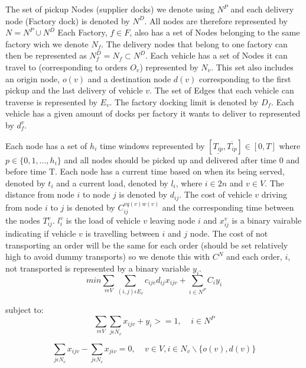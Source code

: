 \documentclass[a4paper,12pt]{article}
\begin{document}
The set of pickup Nodes (supplier docks) we denote using $N^P$ and each delivery node (Factory dock) is denoted by $N^D$. All nodes are therefore represented by $N = N^P \cup N^D$ Each Factory, $f \in F$, also has a set of Nodes belonging to the same factory wich we denote $N_f$. The delivery nodes that belong to one factory can then be represented as $N_f^D = N_f \subset N^D$. 
Each vehicle has a set of Nodes it can travel to (corresponding to orders $O_v$) represented by $N_v$. This set also includes an origin node, $o(v)$ and a destination node $d(v)$ corresponding to the first pickup and the last delivery of vehicle $v$. The set of Edges that each vehicle can traverse is represented by $E_v$. The factory docking limit is denoted by $D_f$. Each vehicle has a given amount of docks per factory it wants to deliver to represented by $d_{f}^v$. \par 
Each node has a set of $h_i$ time windows represented by $[ \underline{T_{ip}},  \overline{T_{ip}} ] \in [0,T]$ where $p \in \{0,1,...,h_i\}$ and all nodes should be picked up and delivered after time 0 and before time T. Each node has a current time based on when its being served, denoted by $t_{i}$ and a current load, denoted by $l_{i}$, where $i \in 2n$ and $v \in V$. The distance from node $i$ to node $j$ is denoted by $d_{ij}$. The cost of vehicle $v$ driving from node $i$ to $j$ is denoted by $C_{ij}^{vq(v)w(v)}$ and the corresponding time between the nodes $T_{ij}^v$. $l_{i}^v$ is the load of vehicle $v$ leaving node $i$ and $x_{ij}^v$ is a binary vairable indicating if vehicle $v$ is travelling between $i$ and $j$ node. The cost of not transporting an order will be the same for each order (should be set relatively high to avoid dummy transports) so we denote this with $C^N$ and each order, $i$,  not transported is represented by a binary variable $y_i$. 
\begin{equation}
\label{eq:1}
min\sum_{v\epsilon V} \sum_{(i,j) \epsilon E_v} c_{ijv}d_{ij}x_{ijv} + \sum_{i\in N^P}C_iy_i
\end{equation}

subject to:
\begin{equation} \label{eq:3}
    \sum_{v\epsilon V}\sum_{j\epsilon N_v}x_{ijv} + y_i >= 1, ~~~~~ i \in N^P
\end{equation}

\begin{equation} \label{eq:4}
    \sum_{j\epsilon N_v}x_{ijv} - \sum_{j\epsilon N_v}x_{jiv} = 0, ~~~~~ v \in V, i\in N_v \backslash \{o(v), d(v)\} 
\end{equation}
\end{document}
